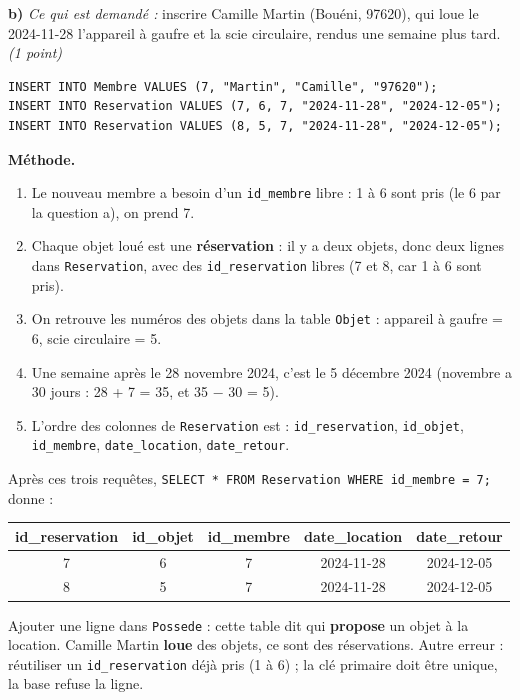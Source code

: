 \documentclass[11pt, a4paper]{exam}
\newcommand{\code}[1]{\texttt{#1}}
\newcommand{\rappel}[1]{\noindent\textit{Ce qui est demandé :} #1\par\smallskip}
\newcommand{\methode}{\noindent\textbf{Méthode.}\ }
\begin{document}
\textbf{b)} \rappel{inscrire Camille Martin (Bouéni, 97620), qui loue le 2024-11-28 l'appareil à gaufre et la scie circulaire, rendus une semaine plus tard. \hfill\textit{(1 point)}}
\begin{reponse}
\begin{lstlisting}
INSERT INTO Membre VALUES (7, "Martin", "Camille", "97620");
INSERT INTO Reservation VALUES (7, 6, 7, "2024-11-28", "2024-12-05");
INSERT INTO Reservation VALUES (8, 5, 7, "2024-11-28", "2024-12-05");
\end{lstlisting}
\end{reponse}
\methode
\begin{enumerate}
\item Le nouveau membre a besoin d'un \code{id\_membre} libre : 1 à 6 sont pris (le 6 par la question a), on prend 7.
\item Chaque objet loué est une \textbf{réservation} : il y a deux objets, donc deux lignes dans \code{Reservation}, avec des \code{id\_reservation} libres (7 et 8, car 1 à 6 sont pris).
\item On retrouve les numéros des objets dans la table \code{Objet} : appareil à gaufre = 6, scie circulaire = 5.
\item Une semaine après le 28 novembre 2024, c'est le 5 décembre 2024 (novembre a 30 jours : 28 + 7 = 35, et 35 $-$ 30 = 5).
\item L'ordre des colonnes de \code{Reservation} est : \code{id\_reservation}, \code{id\_objet}, \code{id\_membre}, \code{date\_location}, \code{date\_retour}.
\end{enumerate}
Après ces trois requêtes, \code{SELECT * FROM Reservation WHERE id\_membre = 7;} donne :
\begin{center}\small\begin{tabular}{|c|c|c|c|c|}\hline id\_reservation & id\_objet & id\_membre & date\_location & date\_retour \\\hline 7 & 6 & 7 & 2024-11-28 & 2024-12-05 \\ 8 & 5 & 7 & 2024-11-28 & 2024-12-05 \\\hline\end{tabular}\end{center}

\begin{erreur}
Ajouter une ligne dans \code{Possede} : cette table dit qui \textbf{propose} un objet à la location. Camille Martin \textbf{loue} des objets, ce sont des réservations. Autre erreur : réutiliser un \code{id\_reservation} déjà pris (1 à 6) ; la clé primaire doit être unique, la base refuse la ligne.
\end{erreur}
\end{document}
